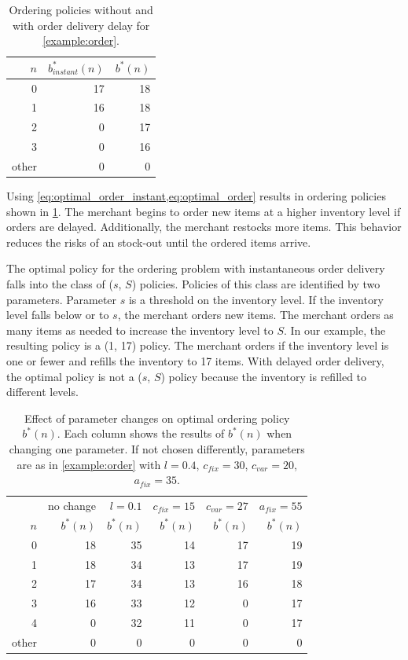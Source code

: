 \begin{table}[t]
	\centering
	\begin{tabular}{rrr}
		\toprule
		$n$ & $b^*_{instant}(n)$ & $b^*(n)$ \\
		\midrule
		0 & 17 & 18 \\
		1 & 16 & 18 \\
		2 & 0 & 17 \\
		3 & 0 & 16\\
		other & 0 & 0 \\
		\bottomrule
	\end{tabular}
\caption[Numeric Example: Ordering Policies]{Ordering policies without and with order delivery delay for \cref{example:order}.}
\label{tab:order_results}
\end{table}

Using \cref{eq:optimal_order_instant,eq:optimal_order} results in ordering policies shown in \cref{tab:order_results}.
The merchant begins to order new items at a higher inventory level if orders are delayed.
Additionally, the merchant restocks more items.
This behavior reduces the risks of an stock-out until the ordered items arrive.

The optimal policy for the ordering problem with instantaneous order delivery falls into the class of ($s$, $S$) policies.
Policies of this class are identified by two parameters.
Parameter $s$ is a threshold on the inventory level.
If the inventory level falls below or to $s$, the merchant orders new items.
The merchant orders as many items as needed to increase the inventory level to $S$.
In our example, the resulting policy is a (1, 17) policy.
The merchant orders if the inventory level is one or fewer and refills the inventory to 17 items.
With delayed order delivery, the optimal policy is not a ($s$, $S$) policy because the inventory is refilled to different levels.

\begin{table}
	\centering
	\begin{tabular}{rrrrrr}
		\toprule
		& no change & $l= 0.1$ & $c_{fix} = 15$ & $c_{var} = 27$ & $a_{fix} = 55$ \\
		$n$ & $b^*(n)$ & $b^*(n)$ & $b^*(n)$ & $b^*(n)$ & $b^*(n)$ \\
		\midrule
		0 & 18 & 35 & 14 & 17 & 19\\
		1 & 18 & 34 & 13 & 17 & 19\\
		2 & 17 & 34 & 13 & 16 & 18\\
		3 & 16 & 33 & 12 &  0 & 17\\
		4 &  0 & 32 & 11 &  0 & 17\\
		other & 0 & 0 & 0 & 0 &  0\\
		\bottomrule
	\end{tabular}
	\caption[Effect of Parameter Changes on Optimal Ordering Policy]{Effect of parameter changes on optimal ordering policy $b^*(n)$.
	Each column shows the results of $b^*(n)$ when changing one parameter.
	If not chosen differently, parameters are as in \cref{example:order} with $l=0.4$, $c_{fix}=30$, $c_{var}=20$, $a_{fix}=35$.}
	\label{table:order_policy_parameter}
\end{table}


